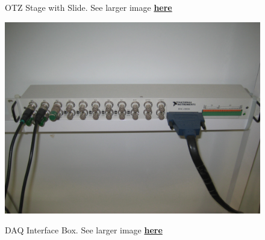 \documentclass{../lab}
\begin{document}
\begin{figure}[h]
\begin{minipage}{0.32\textwidth}
    \caption{OTZ Stage with Slide. See larger image \href{http://experimentationlab.berkeley.edu/sites/default/files/images/OTZ_3551_Crop.jpg}{\textbf{here}}}
\end{minipage}
\begin{minipage}{0.32\textwidth}
    \href{http://experimentationlab.berkeley.edu/sites/default/files/images/OTZ_DAQ_Interface_3554.jpg}{\includegraphics[width=\linewidth,keepaspectratio]{images/OTZ_DAQ_Interface_3554.jpg}}
    \caption{DAQ Interface Box. See larger image \href{http://experimentationlab.berkeley.edu/sites/default/files/images/OTZ_DAQ_Interface_3554.jpg}{\textbf{here}}}
\end{minipage}
\end{figure}
\end{document}
